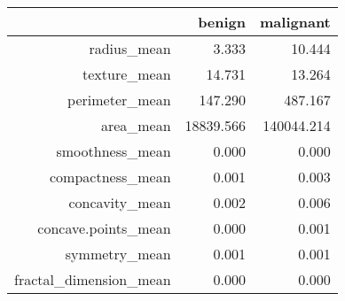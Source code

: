 \setlength{\headheight}{14pt}

\begin{table}[H]
\centering
\begin{tabular}{r|rr}
 & benign & malignant \\ 
  \hline
radius\_mean & 3.333 & 10.444 \\ 
  texture\_mean & 14.731 & 13.264 \\ 
  perimeter\_mean & 147.290 & 487.167 \\ 
  area\_mean & 18839.566 & 140044.214 \\ 
  smoothness\_mean & 0.000 & 0.000 \\ 
  compactness\_mean & 0.001 & 0.003 \\ 
  concavity\_mean & 0.002 & 0.006 \\ 
  concave.points\_mean & 0.000 & 0.001 \\ 
  symmetry\_mean & 0.001 & 0.001 \\ 
  fractal\_dimension\_mean & 0.000 & 0.000 \\ 
\end{tabular}
\end{table}